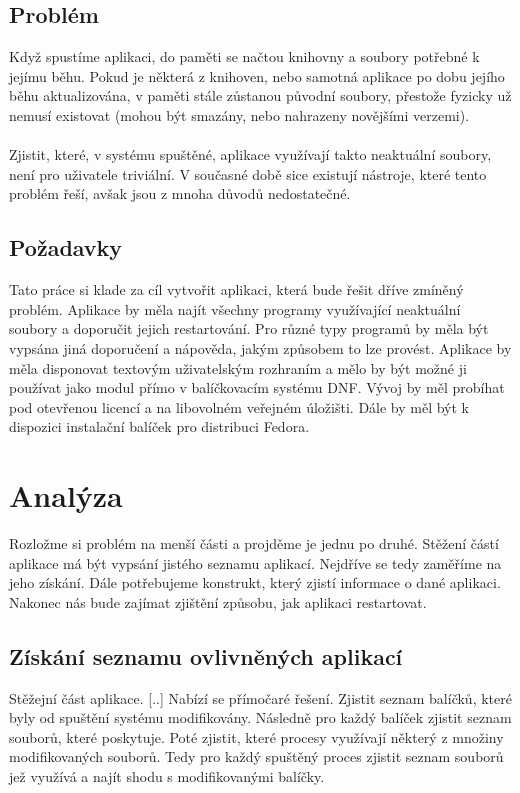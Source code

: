 \documentclass[10pt,a4paper]{article}
\begin{document}
		\subsection{Problém}
		Když spustíme aplikaci, do paměti se načtou knihovny a soubory potřebné k jejímu běhu. Pokud je některá z knihoven, nebo samotná aplikace po dobu jejího běhu aktualizována, v paměti stále zůstanou původní soubory, přestože fyzicky už nemusí existovat (mohou být smazány, nebo nahrazeny novějšími verzemi).
		\\\\
		Zjistit, které, v systému spuštěné, aplikace využívají takto neaktuální soubory, není pro uživatele triviální. V současné době sice existují nástroje, které tento problém řeší, avšak jsou z mnoha důvodů nedostatečné.

		\subsection{Požadavky}
		Tato práce si klade za cíl vytvořit aplikaci, která bude řešit dříve zmíněný problém. Aplikace by měla najít všechny programy využívající neaktuální soubory a doporučit jejich restartování. Pro různé typy programů by měla být vypsána jiná doporučení a nápověda, jakým způsobem to lze provést. Aplikace by měla disponovat textovým uživatelským rozhraním a mělo by být možné ji používat jako modul přímo v balíčkovacím systému DNF\@. Vývoj by měl probíhat pod otevřenou licencí a na libovolném veřejném úložišti. Dále by měl být k dispozici instalační balíček pro distribuci Fedora.

	\section{Analýza}
	Rozložme si problém na menší části a projděme je jednu po druhé. Stěžení částí aplikace má být vypsání jistého seznamu aplikací. Nejdříve se tedy zaměříme na jeho získání. Dále potřebujeme konstrukt, který zjistí informace o  dané aplikaci. Nakonec nás bude zajímat zjištění způsobu, jak aplikaci restartovat.
	
		\subsection{Získání seznamu ovlivněných aplikací}
		Stěžejní část aplikace. [..] Nabízí se přímočaré řešení. Zjistit seznam balíčků, které byly od spuštění systému modifikovány. Následně pro každý balíček zjistit seznam souborů, které poskytuje. Poté zjistit, které procesy využívají některý z množiny modifikovaných souborů. Tedy pro každý spuštěný proces zjistit seznam souborů jež využívá a najít shodu s modifikovanými balíčky.
		
\end{document}
